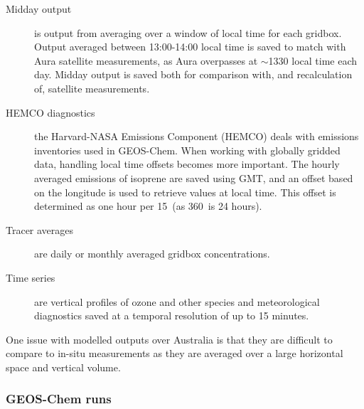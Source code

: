  
  \begin{description}
    \item[Midday output]%
    is output from averaging over a window of local time for each gridbox. 
    Output averaged between 13:00-14:00 local time is saved to match with Aura satellite measurements, as Aura overpasses at $\sim$1330 local time each day.
    Midday output is saved both for comparison with, and recalculation of, satellite measurements.
    \item[HEMCO diagnostics]%
    the Harvard-NASA Emissions Component (HEMCO) deals with emissions inventories used in GEOS-Chem.
    When working with globally gridded data, handling local time offsets becomes more important.
    The hourly averaged emissions of isoprene are saved using GMT, and an offset based on the longitude is used to retrieve values at local time.
    This offset is determined as one hour per 15\degr ~(as 360\degr ~is 24 hours).
    \item[Tracer averages]%
    are daily or monthly averaged gridbox concentrations. 
    \item[Time series]%
    are vertical profiles of ozone and other species and meteorological diagnostics saved at a temporal resolution of up to 15 minutes.
  \end{description}
  
  One issue with modelled outputs over Australia is that they are difficult to compare to in-situ measurements as they are averaged over a large horizontal space and vertical volume.
  
  \subsubsection{GEOS-Chem runs}
  \label{Model:GC:simulations:runs}
  
